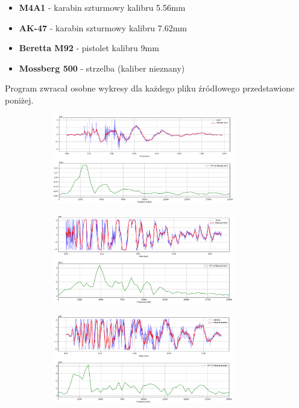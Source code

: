 \begin{itemize}
	\item \textbf{M4A1} - karabin szturmowy kalibru 5.56mm
	\item \textbf{AK-47} - karabin szturmowy kalibru 7.62mm
	\item \textbf{Beretta M92} - pistolet kalibru 9mm
	\item \textbf{Mossberg 500} - strzelba (kaliber nieznany)
\end{itemize}

Program zwracał osobne wykresy dla każdego pliku źródłowego przedstawione poniżej.

\begin{figure}[H]
	\centering
	\begin{subfigure}{.49\textwidth}
		\centering
		\includegraphics[height=3.9cm]{wykresy/AK47_fft.png}
	\end{subfigure}
	\begin{subfigure}{.49\textwidth}
		\centering
		\includegraphics[height=3.9cm]{wykresy/M4A1_fft.png}
	\end{subfigure}
	\begin{subfigure}{.49\textwidth}
		\centering
		\includegraphics[height=3.9cm]{wykresy/Beretta_fft.png}
	\end{subfigure}

\end{figure}
